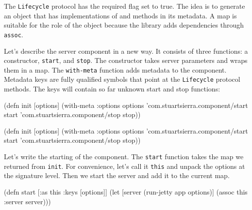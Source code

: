 \begin{english}
\end{english}

The \verb|Lifecycle| protocol has the required flag set to true. The idea is to generate an object that has implementations of  and  methods in its metadata. A map is suitable for the role of the object because the library adds dependencies through \verb|assoc|.

Let's describe the server component in a new way. It consists of three functions: a constructor, \verb|start|, and \verb|stop|. The constructor takes server parameters and wraps them in a map. The \verb|with-meta| function adds metadata to the component. Metadata keys are fully qualified symbols that point at the \verb|Lifecycle| protocol methods. The keys will contain so far unknown start and stop functions:

\ifnarrow

\begin{english}
  \begin{clojure}
(defn init [options]
  (with-meta {:options options}
    {'com.stuartsierra.component/start
     start
     'com.stuartsierra.component/stop
     stop}))
  \end{clojure}
\end{english}

\else

\begin{english}
  \begin{clojure}
(defn init [options]
  (with-meta {:options options}
    {'com.stuartsierra.component/start start
     'com.stuartsierra.component/stop stop}))
  \end{clojure}
\end{english}

\fi

Let's write the starting of the component. The \verb|start| function takes the map we returned from \verb|init|. For convenience, let's call it \verb|this| and unpack the options at the signature level. Then we start the server and add it to the current map.

\begin{english}
  \begin{clojure}
(defn start
  [{:as this :keys [options]}]
  (let [server (run-jetty app options)]
    (assoc this :server server)))
  \end{clojure}
\end{english}


